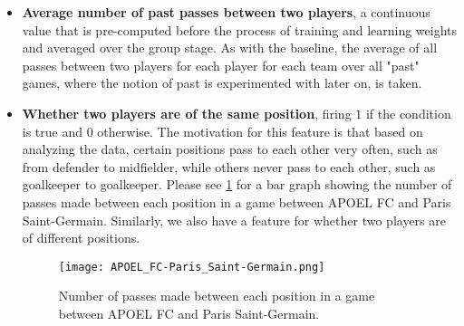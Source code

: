 \documentclass[11pt,letterpaper]{article}
\begin{document}
\begin{itemize}
\item \textbf{Average number of past passes between two players}, a continuous value that is pre-computed before the process of training and learning weights and averaged over the group stage. As with the baseline, the average of all passes between two players for each player for each team over all "past" games, where the notion of past is experimented with later on, is taken.
\item \textbf{Whether two players are of the same position}, firing $1$ if the condition is true and $0$ otherwise. The motivation for this feature is that based on analyzing the data, certain positions pass to each other very often, such as from defender to midfielder, while others never pass to each other, such as goalkeeper to goalkeeper. Please see \ref{fig:barGraph} for a bar graph showing the number of passes made between each position in a game between APOEL FC and Paris Saint-Germain. Similarly, we also have a feature for whether two players are of different positions. 

\begin{figure}
\caption{Number of passes made between each position in a game between APOEL FC and Paris Saint-Germain.}
\centering
\texttt{[image: APOEL\_FC-Paris\_Saint-Germain.png]}
\label{fig:barGraph}
\end{figure}


\end{itemize}
\end{document}
